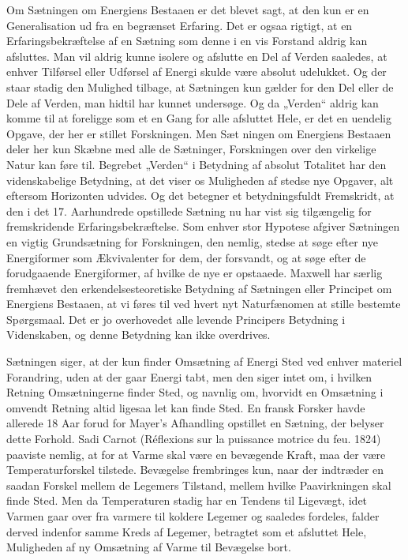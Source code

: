 \documentclass[12pt,a4paper,openany]{book}
\newcommand{\opage}[1]{\marginnote{\footnotesize\textit{[#1]}}}
\begin{document}
Om Sætningen om Energiens Bestaaen er det blevet sagt, at den
kun er en Generalisation ud fra en begrænset Erfaring. Det er ogsaa
rigtigt, at en Erfaringsbekræftelse af en Sætning som denne i en vis
Forstand aldrig kan afsluttes. Man vil aldrig kunne isolere og afslutte
en Del af Verden saaledes, at enhver Tilførsel eller Udførsel
af Energi skulde være absolut udelukket. Og der staar stadig den
Mulighed tilbage, at Sætningen kun gælder for den Del eller de Dele
af Verden, man hidtil har kunnet undersøge. Og da „Verden“ aldrig
kan komme til at foreligge som et en Gang for alle afsluttet Hele,
er det en uendelig Opgave, der her er stillet Forskningen. Men Sæt%
\opage{29}ningen om Energiens Bestaaen deler her kun Skæbne med alle de
Sætninger, Forskningen over den virkelige Natur kan føre til. Begrebet
„Verden“ i Betydning af absolut Totalitet har den videnskabelige
Betydning, at det viser os Muligheden af stedse nye Opgaver,
alt eftersom Horizonten udvides. Og det betegner et betydningsfuldt
Fremskridt, at den i det 17. Aarhundrede opstillede Sætning nu har
vist sig tilgængelig for fremskridende Erfaringsbekræftelse. Som enhver
stor Hypotese afgiver Sætningen en vigtig Grundsætning for
Forskningen, den nemlig, stedse at søge efter nye Energiformer som
Ækvivalenter for dem, der forsvandt, og at søge efter de forudgaaende
Energiformer, af hvilke de nye er opstaaede. Maxwell har særlig
fremhævet den erkendelsesteoretiske Betydning af Sætningen
eller Principet om Energiens Bestaaen, at vi føres til ved hvert nyt
Naturfænomen at stille bestemte Spørgsmaal. Det er jo overhovedet
alle levende Principers Betydning i Videnskaben, og denne Betydning
kan ikke overdrives.

Sætningen siger, at der kun finder Omsætning af Energi Sted ved
enhver materiel Forandring, uden at der gaar Energi tabt, men den
siger intet om, i hvilken Retning Omsætningerne finder Sted, og
navnlig om, hvorvidt en Omsætning i omvendt Retning altid ligesaa
let kan finde Sted. En fransk Forsker havde allerede 18 Aar forud
for Mayer’s Afhandling opstillet en Sætning, der belyser dette Forhold.
Sadi Carnot (Réflexions sur la puissance motrice du feu. 1824)
paaviste nemlig, at for at Varme skal være en bevægende Kraft, maa
der være Temperaturforskel tilstede. Bevægelse frembringes kun,
naar der indtræder en saadan Forskel mellem de Legemers Tilstand,
mellem hvilke Paavirkningen skal finde Sted. Men da Temperaturen
stadig har en Tendens til Ligevægt, idet Varmen gaar over fra varmere
til koldere Legemer og saaledes fordeles, falder derved indenfor
samme Kreds af Legemer, betragtet som et afsluttet Hele, Muligheden
af ny Omsætning af Varme til Bevægelse bort.
\end{document}
